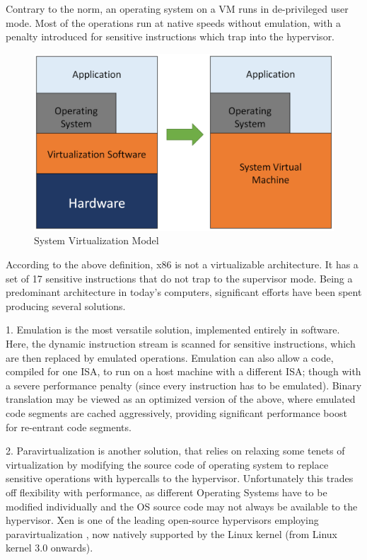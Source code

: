Contrary to the norm, an operating system on a VM runs in de-privileged user mode. Most of the operations run at native speeds without emulation, with a penalty introduced for sensitive instructions which trap into the hypervisor.

\setlength{\belowcaptionskip}{-10pt}

\begin{figure}[H]
  \centering
  \includegraphics[scale=0.6]{figures/sys_virt.png}
  \caption{System Virtualization Model}
  \label{fig:sys_virt}
\end{figure}

According to the above definition, x86 is not a virtualizable architecture. It has a set of 17 sensitive instructions that do not trap to the supervisor mode. Being a predominant architecture in today’s computers, significant efforts have been spent producing several solutions.

1. Emulation is the most versatile solution, implemented entirely in software. Here, the dynamic instruction stream is scanned for sensitive instructions, which are then replaced by emulated operations. Emulation can also allow a code, compiled for one ISA, to run on a host machine with a different ISA; though with a severe performance penalty (since every instruction has to be emulated). Binary translation may be viewed as an optimized version of the above, where emulated code segments are cached aggressively, providing significant performance boost for re-entrant code segments.

2. Paravirtualization is another solution, that relies on relaxing some tenets of virtualization by modifying the source code of operating system to replace sensitive operations with hypercalls to the hypervisor. Unfortunately this trades off flexibility with performance, as different Operating Systems have to be modified individually and the OS source code may not always be available to the hypervisor. Xen is one of the leading open-source hypervisors employing paravirtualization \cite{xen_virt}, now natively supported by the Linux kernel (from Linux kernel 3.0 onwards).


